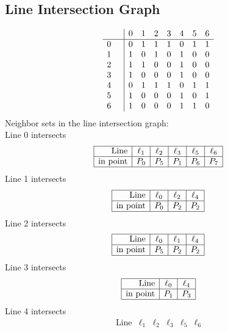 \documentclass{article}
\begin{document}
{\subsection*{Line Intersection Graph}
{\arraycolsep=1pt
$$
\begin{array}{rr|*{7}r}
 &  & 0 & 1 & 2 & 3 & 4 & 5 & 6\\
\hline
0 &  & 0 & 1 & 1 & 1 & 0 & 1 & 1\\
1 &  & 1 & 0 & 1 & 0 & 1 & 0 & 0\\
2 &  & 1 & 1 & 0 & 0 & 1 & 0 & 0\\
3 &  & 1 & 0 & 0 & 0 & 1 & 0 & 0\\
4 &  & 0 & 1 & 1 & 1 & 0 & 1 & 1\\
5 &  & 1 & 0 & 0 & 0 & 1 & 0 & 1\\
6 &  & 1 & 0 & 0 & 0 & 1 & 1 & 0\\
\end{array}
$$
}%
Neighbor sets in the line intersection graph:\\
Line 0 intersects 
$$
\begin{array}{|r*{5}{|c}|}
\hline
\mbox{Line}  & \ell_{1} & \ell_{2} & \ell_{3} & \ell_{5} & \ell_{6}\\
\hline
\mbox{in point}  & P_{0} & P_{5} & P_{1} & P_{6} & P_{7}\\
\hline
\end{array}
$$
Line 1 intersects 
$$
\begin{array}{|r*{3}{|c}|}
\hline
\mbox{Line}  & \ell_{0} & \ell_{2} & \ell_{4}\\
\hline
\mbox{in point}  & P_{0} & P_{2} & P_{2}\\
\hline
\end{array}
$$
Line 2 intersects 
$$
\begin{array}{|r*{3}{|c}|}
\hline
\mbox{Line}  & \ell_{0} & \ell_{1} & \ell_{4}\\
\hline
\mbox{in point}  & P_{5} & P_{2} & P_{2}\\
\hline
\end{array}
$$
Line 3 intersects 
$$
\begin{array}{|r*{2}{|c}|}
\hline
\mbox{Line}  & \ell_{0} & \ell_{4}\\
\hline
\mbox{in point}  & P_{1} & P_{3}\\
\hline
\end{array}
$$
Line 4 intersects 
$$
\begin{array}{|r*{5}{|c}|}
\hline
\mbox{Line}  & \ell_{1} & \ell_{2} & \ell_{3} & \ell_{5} & \ell_{6}\\

\end{array}$$}
\end{document}
